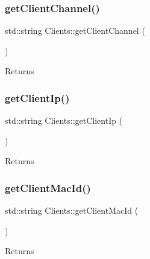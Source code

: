 \subsubsection{\texorpdfstring{get\+Client\+Channel()}{getClientChannel()}}
{\footnotesize\ttfamily std\+::string Clients\+::get\+Client\+Channel (\begin{DoxyParamCaption}{ }\end{DoxyParamCaption})}





\begin{DoxyReturn}{Returns}

\end{DoxyReturn}
\mbox{\label{class_clients_ab18c2d6ccb3a0779abf0949d2f6d9747}} 
\subsubsection{\texorpdfstring{get\+Client\+Ip()}{getClientIp()}}
{\footnotesize\ttfamily std\+::string Clients\+::get\+Client\+Ip (\begin{DoxyParamCaption}{ }\end{DoxyParamCaption})}





\begin{DoxyReturn}{Returns}

\end{DoxyReturn}
\mbox{\label{class_clients_ae00e652fbc85d9f2fbbf84a2c79385f7}} 
\subsubsection{\texorpdfstring{get\+Client\+Mac\+Id()}{getClientMacId()}}
{\footnotesize\ttfamily std\+::string Clients\+::get\+Client\+Mac\+Id (\begin{DoxyParamCaption}{ }\end{DoxyParamCaption})}





\begin{DoxyReturn}{Returns}

\end{DoxyReturn}
\mbox{\label{class_clients_a96ae9e59ebdb0f56a933a1d1f4cfc080}} 
